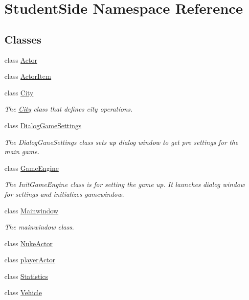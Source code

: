 \hypertarget{namespace_student_side}{\section{Student\-Side Namespace Reference}
\label{namespace_student_side}
}
\subsection*{Classes}
\begin{DoxyCompactItemize}
\item 
class \hyperlink{class_student_side_1_1_actor}{Actor}
\item 
class \hyperlink{class_student_side_1_1_actor_item}{Actor\-Item}
\item 
class \hyperlink{class_student_side_1_1_city}{City}
\begin{DoxyCompactList}\small\item\em The \hyperlink{class_student_side_1_1_city}{City} class that defines city operations. \end{DoxyCompactList}\item 
class \hyperlink{class_student_side_1_1_dialog_game_settings}{Dialog\-Game\-Settings}
\begin{DoxyCompactList}\small\item\em The Dialog\-Gane\-Settings class sets up dialog window to get pre settings for the main game. \end{DoxyCompactList}\item 
class \hyperlink{class_student_side_1_1_game_engine}{Game\-Engine}
\begin{DoxyCompactList}\small\item\em The Init\-Game\-Engine class is for setting the game up. It launches dialog window for settings and initializes gamewindow. \end{DoxyCompactList}\item 
class \hyperlink{class_student_side_1_1_mainwindow}{Mainwindow}
\begin{DoxyCompactList}\small\item\em The mainwindow class. \end{DoxyCompactList}\item 
class \hyperlink{class_student_side_1_1_nuke_actor}{Nuke\-Actor}
\item 
class \hyperlink{class_student_side_1_1player_actor}{player\-Actor}
\item 
class \hyperlink{class_student_side_1_1_statistics}{Statistics}
\item 
class \hyperlink{class_student_side_1_1_vehicle}{Vehicle}
\end{DoxyCompactItemize}
